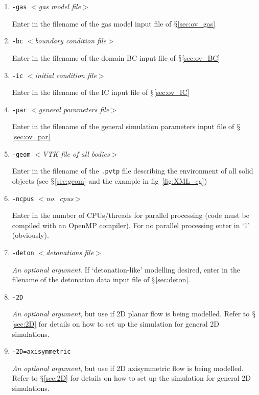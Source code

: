 \documentclass[pdftex, 12pt, a4paper]{report}
\begin{document}
\begin{enumerate}
\item \verb'-gas' $<$\emph{gas model file}$>$

Enter in the filename of the gas model input file of $\mathsection$\ref{sec:ov_gas}

\item \verb'-bc' $<$\emph{boundary condition file}$>$

Enter in the filename of the domain BC input file of $\mathsection$\ref{sec:ov_BC}

\item \verb'-ic' $<$\emph{initial condition file}$>$

Enter in the filename of the IC input file of $\mathsection$\ref{sec:ov_IC}

\item \verb'-par' $<$\emph{general parameters file}$>$

Enter in the filename of the general simulation parameters input file of $\mathsection$\ref{sec:ov_par}

\item \verb'-geom' $<$\emph{VTK file of all bodies}$>$

Enter in the filename of the \verb'.pvtp' file describing the environment of all solid objects (see $\mathsection$\ref{sec:geom} and
the example in fig~\ref{fig:XML_eg})

\item \verb'-ncpus' $<$\emph{no.\ cpus}$>$

Enter in the number of CPUs/threads for parallel processing (code must be compiled with an OpenMP compiler).  For no parallel
processing enter in `1' (obviously).

\item \verb'-deton' $<$\emph{detonations file}$>$

\emph{An optional argument}.  If `detonation-like' modelling desired, enter in the filename of the detonation data input file of
$\mathsection$\ref{sec:deton}.

\item \verb'-2D'

\emph{An optional argument}, but use if 2D planar flow is being modelled.  Refer to $\mathsection$\ref{sec:2D} for details on how to
set up the simulation for general 2D simulations.

\item \verb'-2D=axisymmetric'

\emph{An optional argument}, but use if 2D axisymmetric flow is being modelled.  Refer to $\mathsection$\ref{sec:2D} for details on how to
set up the simulation for general 2D simulations.


\end{enumerate}
\end{document}
